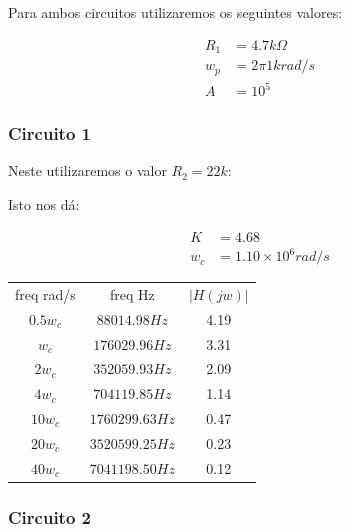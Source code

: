 Para ambos circuitos utilizaremos os seguintes valores:


\begin{equation}
    \begin{aligned}
        R_1 & = 4.7k \varOmega \\
        w_p & = 2 \pi 1k rad/s \\
        A   & = 10^5
    \end{aligned}
\end{equation}


\subsubsection{Circuito 1}


Neste utilizaremos o valor  $R_2 = 22k$:


Isto nos dá:


\begin{equation}
    \begin{aligned}
        K   & = 4.68                     \\
        w_c & = 1.10 \times 10^{6} rad/s
    \end{aligned}
\end{equation}


\begin{center}
    \begin{tabular}{ |c|c|c| }
        \hline
        freq rad/s & freq Hz         & $\lvert H(jw) \rvert$ \\
        $0.5 w_c$  & $88014.98 Hz$   & 4.19                  \\
        $w_c$      & $176029.96 Hz$  & 3.31                  \\
        $2 w_c$    & $352059.93 Hz$  & 2.09                  \\
        $4 w_c$    & $704119.85 Hz$  & 1.14                  \\
        $10 w_c$   & $1760299.63 Hz$ & 0.47                  \\
        $20 w_c$   & $3520599.25 Hz$ & 0.23                  \\
        $40 w_c$   & $7041198.50 Hz$ & 0.12                  \\
        \hline
    \end{tabular}
\end{center}


\subsubsection{Circuito 2}



